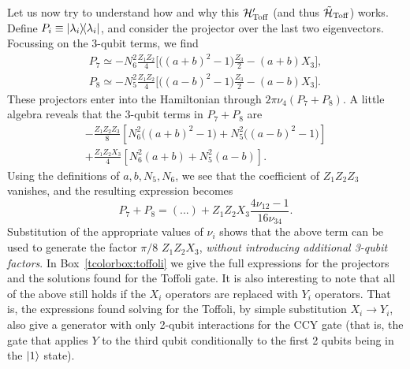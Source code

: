 Let us now try to understand how and why this ${\mathcal{H}}'_{\operatorname{Toff}}$ (and thus $\tilde{{\mathcal{H}}}_{\operatorname{Toff}}$) works.
Define $P_i \equiv \ketbra{\lambda_i}$,
and consider the projector over the last two eigenvectors.
Focussing on the 3-qubit terms, we find
\begin{equation}
\begin{aligned}
	P_7 \simeq - N_6^2 \frac{Z_1 Z_2}{4} \bigg[
		\big((a + b)^2 - 1\big) \frac{Z_3}{2}
		- (a + b) X_3
	\bigg], \\
	P_8 \simeq - N_5^2 \frac{Z_1 Z_2}{4} \bigg[
		\big((a - b)^2 - 1\big) \frac{Z_3}{2}
		- (a - b) X_3
	\bigg].
\end{aligned}
\end{equation}
These projectors enter into the Hamiltonian through $2\pi \nu_{4} (P_7 + P_8)$.
A little algebra reveals that the 3-qubit terms in $P_7 + P_8$ are
\begin{equation}
\begin{aligned}
	- \frac{Z_1 Z_2 Z_3}{8} \left[
		N_6^2\big((a+b)^2 - 1\big)
		+ N_5^2 \big((a-b)^2 - 1\big)
	\right] \\
	+ \frac{Z_1 Z_2 X_3}{4} \left[
		N_6^2(a+b) + N_5^2(a-b)
	\right].
\end{aligned}
\end{equation}
Using the definitions of $a,b,N_5,N_6$, we see that the coefficient of $Z_1 Z_2 Z_3$ vanishes, and the resulting expression becomes
\begin{equation}
	P_7 + P_8 = (...) +
	Z_1 Z_2 X_3 \frac{4\nu_{12}-1}{16\nu_{34}}.
\end{equation}
Substitution of the appropriate values of $\nu_i$ shows that the above term can be used to generate the factor $\pi/8 \,\,Z_1 Z_2 X_3$,
\emph{without introducing additional 3-qubit factors}.
In Box~\ref{tcolorbox:toffoli} we give the full expressions for the projectors and the solutions found for the Toffoli gate.
It is also interesting to note that all of the above still holds if the $X_i$ operators are replaced with $Y_i$ operators.
That is, the expressions found solving for the Toffoli, by simple substitution $X_i \to Y_i$,
also give a generator with only 2-qubit interactions for the CCY gate
(that is, the gate that applies $Y$ to the third qubit conditionally to the first 2 qubits being in the $\ket1$ state).

